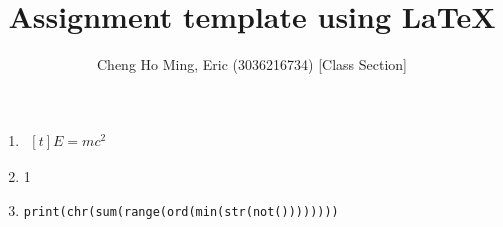 \documentclass{article}
\title{Assignment template using LaTeX}
\author{Cheng Ho Ming, Eric (3036216734) [Class Section]}
\begin{document}
\maketitle

\begin{enumerate}[label=(\alph*)]
\item $\begin{aligned}[t]
E=mc^2
\end{aligned}$

\item 1
\item
    \begin{verbatim}
print(chr(sum(range(ord(min(str(not())))))))
    \end{verbatim}
\end{enumerate}
\end{document}
